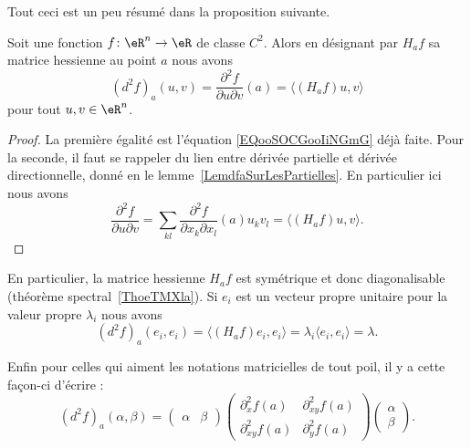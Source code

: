 Tout ceci est un peu résumé dans la proposition suivante.
\begin{proposition}     \label{PROPooFWZYooUQwzjW}
	Soit une fonction \( f\colon \eR^n\to \eR\) de classe \( C^2\). Alors en désignant par \( H_af\) sa matrice hessienne au point \( a\) nous avons
	\begin{equation}
		(d^2f)_a(u,v)=\frac{ \partial^2f }{ \partial u\partial v }(a)=\langle (H_af)u, v\rangle
	\end{equation}
	pour tout \( u,v\in \eR^n\).
\end{proposition}

\begin{proof}
	La première égalité est l'équation \eqref{EQooSOCGooIiNGmG} déjà faite. Pour la seconde, il faut se rappeler du lien entre dérivée partielle et dérivée directionnelle, donné en le lemme~\ref{LemdfaSurLesPartielles}. En particulier ici nous avons
	\begin{equation}
		\frac{ \partial^2f }{ \partial u\partial v }=\sum_{kl}\frac{ \partial^2f }{ \partial x_k\partial x_l  }(a)u_kv_l=\langle (H_af)u, v\rangle .
	\end{equation}
\end{proof}

En particulier, la matrice hessienne \( H_af\) est symétrique et donc diagonalisable (théorème spectral~\ref{ThoeTMXla}). Si \( e_i\) est un vecteur propre unitaire pour la valeur propre \( \lambda_i\) nous avons
\begin{equation}
	(d^2f)_a(e_i,e_i)=\langle (H_af)e_i, e_i\rangle =\lambda_i\langle e_i, e_i\rangle =\lambda.
\end{equation}

Enfin pour celles qui aiment les notations matricielles de tout poil, il y a cette façon-ci d'écrire :
\begin{equation}
	(d^2f)_a(\alpha,\beta)=\begin{pmatrix}
		\alpha & \beta
	\end{pmatrix}\begin{pmatrix}
		\partial^2_xf(a)    & \partial^2_{xy}f(a) \\
		\partial^2_{xy}f(a) & \partial^2_yf(a)
	\end{pmatrix}\begin{pmatrix}
		\alpha \\
		\beta
	\end{pmatrix}.
\end{equation}

